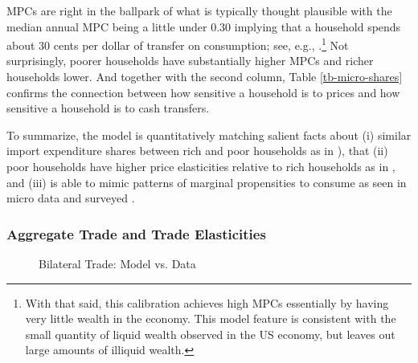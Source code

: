 \documentclass[12pt,pdftex]{article}
\begin{document}
\begin{onehalfspacing}
MPCs are right in the ballpark of what is typically thought plausible with the median annual MPC being a little under 0.30 implying that a household spends about 30 cents per dollar of transfer on consumption; see, e.g., \citet{kaplan2022marginal}.\footnote{With that said, this calibration achieves high MPCs essentially by having very little wealth in the economy. This model feature is consistent with the small quantity of liquid wealth observed in the US economy, but leaves out large amounts of illiquid wealth.} Not surprisingly, poorer households have substantially higher MPCs and richer households lower. And together with the second column, Table \ref{tb-micro-shares} confirms the connection between how sensitive a household is to prices and how sensitive a household is to cash transfers.

To summarize, the model is quantitatively matching salient facts about (i) similar import expenditure shares between rich and poor households as in \citet{borusyak2021distributional}), that (ii) poor households have higher price elasticities relative to rich households as in \citet{auer2022unequal}, and (iii) is able to mimic patterns of marginal propensities to consume as seen in micro data and surveyed \citet{kaplan2022marginal}.

\subsubsection{Aggregate Trade and Trade Elasticities}

\begin{figure}[!t]
\caption{Bilateral Trade: Model vs. Data}\label{fig:model-fit}
\end{figure}


\end{onehalfspacing}
\end{document}
